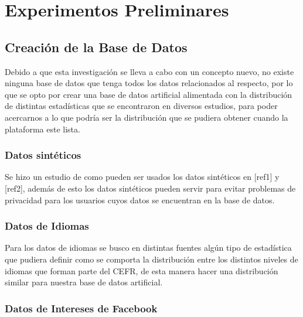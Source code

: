 \chapter{Experimentos Preliminares}
\label{chapter:chapter04}


\section{Creación de la Base de Datos}

Debido a que esta investigación se lleva a cabo con un concepto nuevo, no existe ninguna base de datos que tenga todos los datos relacionados al respecto, por lo que se opto por crear una base de datos artificial alimentada con la distribución de distintas estadísticas que se encontraron en diversos estudios, para poder acercarnos a lo que podría ser la distribución que se pudiera obtener cuando la plataforma este lista.

\subsection{Datos sintéticos}

Se hizo un estudio de como pueden ser usados los datos sintéticos en [ref1] y [ref2], además de esto los datos sintéticos pueden servir para evitar problemas de privacidad para los usuarios cuyos datos se encuentran en la base de datos.

\subsection{Datos de Idiomas} 

Para los datos de idiomas se busco en distintas fuentes algún tipo de estadística que pudiera definir como se comporta la distribución entre los distintos niveles de idiomas que forman parte del CEFR, de esta manera hacer una distribución similar para nuestra base de datos artificial.

\subsection{Datos de Intereses de Facebook} 

